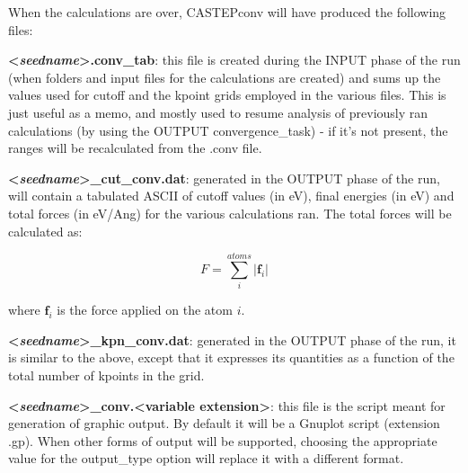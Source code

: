 \documentclass[10pt]{article}
\begin{document}
When the calculations are over, CASTEPconv will have produced the following files:

\textbf{\textless \textit{seedname}\textgreater.conv\_tab}: this file is created during the INPUT phase of the run (when folders and input files for the calculations are created) and sums up the values used for cutoff and the kpoint grids employed in the various files. This is just useful as a memo, and mostly used to resume analysis of previously ran calculations (by using the OUTPUT convergence\_task) - if it's not present, the ranges will be recalculated from the .conv file.

\textbf{\textless \textit{seedname}\textgreater\_cut\_conv.dat}: generated in the OUTPUT phase of the run, will contain a tabulated ASCII of cutoff values (in eV), final energies (in eV) and total forces (in eV/Ang) for the various calculations ran. The total forces will be calculated as:

\begin{equation}
 F = \sum_i^{atoms}|\mathbf{f}_i|
\end{equation}

where $\mathbf{f}_i$ is the force applied on the atom $i$.

\textbf{\textless \textit{seedname}\textgreater\_kpn\_conv.dat}: generated in the OUTPUT phase of the run, it is similar to the above, except that it expresses its quantities as a function of the total number of kpoints in the grid.

\textbf{\textless \textit{seedname}\textgreater\_conv.\textless variable extension\textgreater}: this file is the script meant for generation of graphic output. By default it will be a Gnuplot script (extension .gp). When other forms of output will be supported, choosing the appropriate value for the output\_type option will replace it with a different format.
\end{document}
